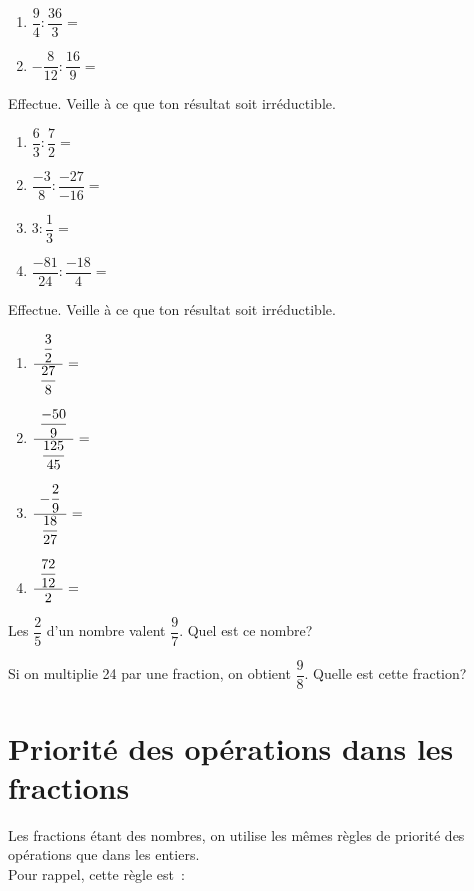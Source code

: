 \documentclass[../../syllabus_2.tex]{subfiles}
\begin{document}
\exemple

\begin{enumerate}[cols=2, itemsep=3cm]
  \item $\dfrac{9}{4} : \dfrac{36}{3}=$
  \item $-\dfrac{8}{12} : \dfrac{16}{9}=$
\end{enumerate}

\vspace{3cm}

\begin{exercise}
  Effectue. Veille à ce que ton résultat soit irréductible.
  \begin{enumerate}[cols=2, itemsep=3cm]
    \item $\dfrac{6}{3} : \dfrac{7}{2}=$
    \item $\dfrac{-3}{8} : \dfrac{-27}{-16}=$
    \item $3 : \dfrac{1}{3}=$
    \item $\dfrac{-81}{24} : \dfrac{-18}{4}=$
  \end{enumerate}
\end{exercise}

\newpage

\begin{exercise}
  Effectue. Veille à ce que ton résultat soit irréductible.
  \begin{enumerate}[cols=2, itemsep=3cm]
    \item $\dfrac{\hspace{4pt}\dfrac{3}{2}\hspace{4pt}}{\hspace{4pt}\dfrac{27}{8}\hspace{4pt}}=$
    \item $\dfrac{\hspace{4pt}\dfrac{-50}{9}\hspace{4pt}}{\hspace{4pt}\dfrac{125}{45}\hspace{4pt}}=$
    \item $\dfrac{\hspace{4pt}-\dfrac{2}{9}\hspace{4pt}}{\hspace{4pt}\dfrac{18}{27}\hspace{4pt}}=$
    \item $\dfrac{\hspace{4pt}\dfrac{72}{12}\hspace{4pt}}{\hspace{4pt}2\hspace{4pt}}=$
  \end{enumerate}
\end{exercise}
\vspace{3cm}

\begin{exercise}
  Les $\dfrac{2}{5}$ d'un nombre valent $\dfrac{9}{7}$. Quel est ce nombre?
\end{exercise}

\vspace{4cm}

\begin{exercise}
  Si on multiplie 24 par une fraction, on obtient $\dfrac{9}{8}$. Quelle est cette fraction?
\end{exercise}

\newpage

\section{Priorité des opérations dans les fractions}
Les fractions étant des nombres, on utilise les mêmes règles de priorité des opérations que dans les entiers.
\\
Pour rappel, cette règle est~:\vspace*{3cm}
\end{document}

